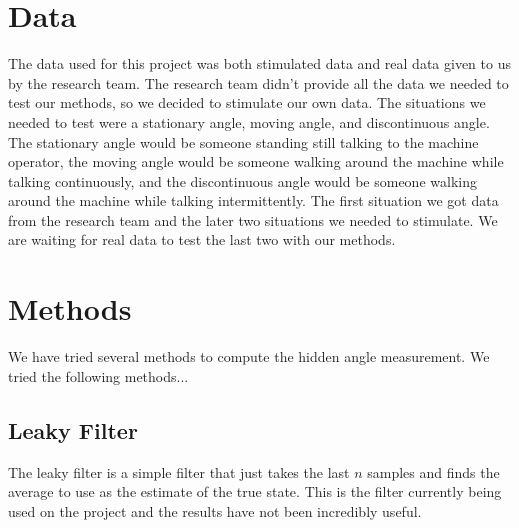 \documentclass[11pt]{amsart}
\begin{document}
\section{Data}
The data used for this project was both stimulated data and real data given to us by the research
team. The research team didn’t provide all the data we needed to test our methods, so we decided to
stimulate our own data. The situations we needed to test were a stationary angle, moving angle, and
discontinuous angle. The stationary angle would be someone standing still talking to the machine
operator, the moving angle would be someone walking around the machine while talking continuously,
and the discontinuous angle would be someone walking around the machine while talking
intermittently. The first situation we got data from the research team and the later two situations
we needed to stimulate. We are waiting for real data to test the last two with our methods. 


\section{Methods}
We have tried several methods to compute the hidden angle measurement. We tried the following methods...

\subsection{Leaky Filter}

The leaky filter is a simple filter that just takes the last $n$ samples and finds the average to use as the estimate of the true state. This is the filter currently being used on the project and the results have not been incredibly useful.
\end{document}
